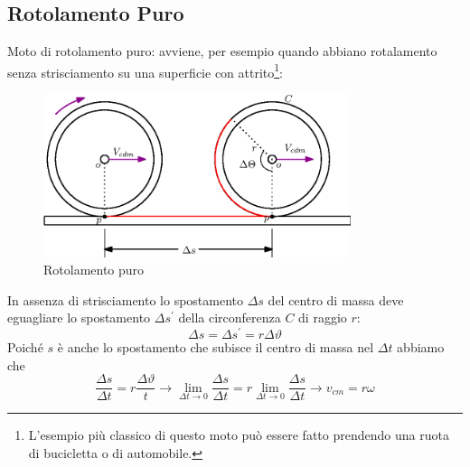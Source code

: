 \documentclass{book}
\begin{document}
\subsection{Rotolamento Puro}
Moto di rotolamento puro: avviene, per esempio quando abbiano rotalamento senza
strisciamento su una superficie con attrito\footnote{L'esempio più classico di questo
moto può essere fatto prendendo una ruota di bucicletta o di automobile.}: 
\begin{figure}[ht]
  \centering
  \includegraphics[width=9cm]{img/finiti/roto-puro.eps}
  \caption{Rotolamento puro}
  \label{fig:roto-puro}
\end{figure}
In assenza di strisciamento lo spostamento $\Delta s$ del centro di massa deve eguagliare
lo spostamento $\Delta s^\prime$ della circonferenza $C$ di raggio $r$:
\begin{equation*}
  \Delta s=\Delta s^\prime=r\Delta \vartheta
\end{equation*}
Poiché $s$ è anche lo spostamento che subisce il centro di massa nel $\Delta t$ abbiamo
che
\begin{equation*}
  \frac{\Delta s}{\Delta t}=r\frac{\Delta \vartheta}{t}\to \lim_{\Delta t\to0}
  \frac{\Delta s}{\Delta t}=r\lim_{\Delta t\to 0}\frac{\Delta s}{\Delta t}\to v_{cm}
  =r\omega
\end{equation*}



\end{document}

